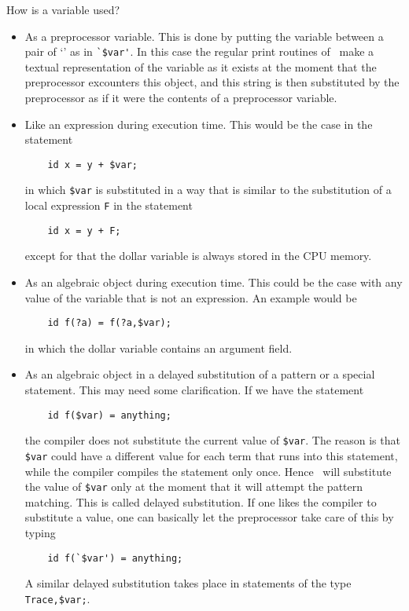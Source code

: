 How is a variable used?
\begin{itemize}
\item As a preprocessor variable. This is done 
by putting the variable between a pair of `' as in \verb:`$var':. In this 
case the regular print routines of \FORM\ make a textual 
representation of 
the variable as it exists at the moment that the preprocessor excounters 
this object, and this string is then substituted by the preprocessor as if 
it were the contents of a preprocessor variable.
\item Like an expression during execution time. This would be the case in 
the statement
\begin{verbatim}
    id x = y + $var;
\end{verbatim}
in which \verb:$var: is substituted 
in a way that is similar to the substitution of a local expression \verb:F: 
in the statement
\begin{verbatim}
    id x = y + F;
\end{verbatim}
except for that the dollar variable is always stored in the CPU memory.
\item As an algebraic object during execution time. This could be the case 
with any value of the variable that is not an expression. An example would 
be
\begin{verbatim}
    id f(?a) = f(?a,$var);
\end{verbatim}
in which the dollar variable contains an 
argument field.
\item As an algebraic object in a delayed substitution of a pattern or a 
special statement. This may need some clarification. If we have the 
statement
\begin{verbatim}
    id f($var) = anything;
\end{verbatim}
the compiler does not substitute 
the current value of \verb:$var:. The reason is that \verb:$var: could have 
a different value for each term that runs into this statement, while the 
compiler compiles the statement only once. Hence \FORM\ will substitute the 
value of \verb:$var: only at the moment that it will attempt the pattern 
matching. This is called delayed 
substitution. If one likes the compiler to 
substitute a value, one can basically let the preprocessor take care of 
this by typing
\begin{verbatim}
    id f(`$var') = anything;
\end{verbatim}
A similar delayed 
substitution takes place in statements of the type \verb:Trace,$var;:.
\end{itemize}

